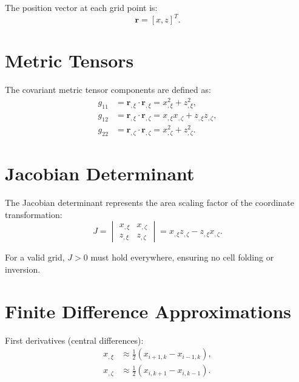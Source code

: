 \documentclass[11pt,a4paper]{report}
\newcommand{\rvec}{\bm{r}}
\begin{document}
The position vector at each grid point is:
\begin{equation}
    \rvec = [x, z]^T.
\end{equation}

\section{Metric Tensors}

The covariant metric tensor components are defined as:
\begin{equation}
\begin{aligned}
    g_{11} &= \rvec_{,\xi} \cdot \rvec_{,\xi} = x_{,\xi}^2 + z_{,\xi}^2, \\
    g_{12} &= \rvec_{,\xi} \cdot \rvec_{,\zeta} = x_{,\xi} x_{,\zeta} + z_{,\xi} z_{,\zeta}, \\
    g_{22} &= \rvec_{,\zeta} \cdot \rvec_{,\zeta} = x_{,\zeta}^2 + z_{,\zeta}^2.
\end{aligned}
\end{equation}

\section{Jacobian Determinant}

The Jacobian determinant represents the area scaling factor of the coordinate transformation:
\begin{equation}
    J = \begin{vmatrix} x_{,\xi} & x_{,\zeta} \\ z_{,\xi} & z_{,\zeta} \end{vmatrix} = x_{,\xi} z_{,\zeta} - z_{,\xi} x_{,\zeta}.
\end{equation}

For a valid grid, $J > 0$ must hold everywhere, ensuring no cell folding or inversion.

\section{Finite Difference Approximations}

First derivatives (central differences):
\begin{equation}
\begin{aligned}
    x_{,\xi} &\approx \frac{1}{2}(x_{i+1,k} - x_{i-1,k}), \\
    x_{,\zeta} &\approx \frac{1}{2}(x_{i,k+1} - x_{i,k-1}).
\end{aligned}
\end{equation}
\end{document}
